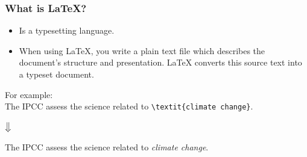 
\begin{frame}[fragile]
\frametitle{What is \LaTeX?}
\begin{itemize}
\item Is a typesetting language. \\
\item When using \LaTeX, you write a plain text file which describes the document's structure and presentation. \LaTeX{} converts this source text into a typeset document. \\
\end{itemize}

For example: \\
\color{purple}
The IPCC assess the science related to \verb!\textit{climate change}!.\\ 
\color{black}
\begin{center}
	$\big\Downarrow$
\end{center}
\color{purple}
\begin{center}
The IPCC assess the science related to \textit{climate change}. \\
\end{center} 
 \end{frame} 


